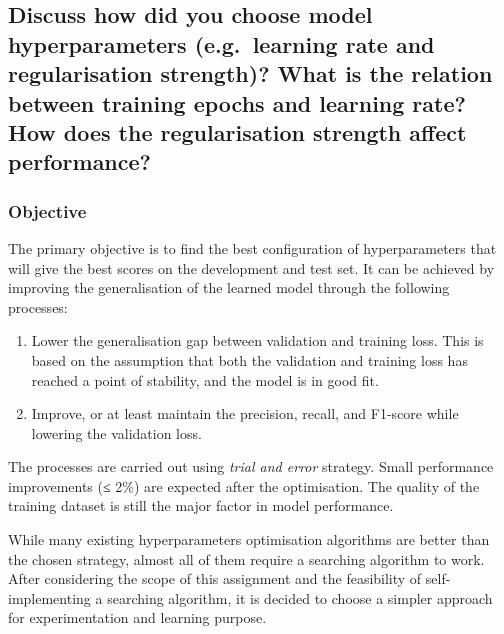 \documentclass[11pt]{article}
\begin{document}
    \hypertarget{discuss-how-did-you-choose-model-hyperparameters-e.g.-learning-rate-and-regularisation-strength-what-is-the-relation-between-training-epochs-and-learning-rate-how-does-the-regularisation-strength-affect-performance}{%
\subsection{Discuss how did you choose model hyperparameters
(e.g.~learning rate and regularisation strength)? What is the relation
between training epochs and learning rate? How does the regularisation
strength affect
performance?}\label{discuss-how-did-you-choose-model-hyperparameters-e.g.-learning-rate-and-regularisation-strength-what-is-the-relation-between-training-epochs-and-learning-rate-how-does-the-regularisation-strength-affect-performance}}

\hypertarget{objective}{%
\subsubsection{Objective}\label{objective}}

The primary objective is to find the best configuration of
hyperparameters that will give the best scores on the development and
test set. It can be achieved by improving the generalisation of the
learned model through the following processes:

\begin{enumerate}
\def\labelenumi{\arabic{enumi}.}
\item
  Lower the generalisation gap between validation and training loss.
  This is based on the assumption that both the validation and training
  loss has reached a point of stability, and the model is in good fit.
\item
  Improve, or at least maintain the precision, recall, and F1-score
  while lowering the validation loss.
\end{enumerate}

The processes are carried out using \emph{trial and error} strategy.
Small performance improvements (≤ 2\%) are expected after the
optimisation. The quality of the training dataset is still the major
factor in model performance.

While many existing hyperparameters optimisation algorithms are better
than the chosen strategy, almost all of them require a searching
algorithm to work. After considering the scope of this assignment and
the feasibility of self-implementing a searching algorithm, it is
decided to choose a simpler approach for experimentation and learning
purpose.
\end{document}
